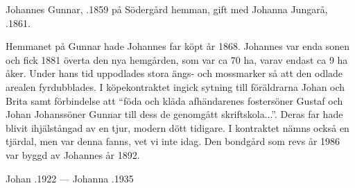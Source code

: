 Johannes Gunnar, .1859 på Södergård hemman, gift med Johanna Jungarå, .1861.
\begin{jhchildren}
  \item {}
  \item {}
  \item {}
  \item {}
  \item {}
  \item {}
  \item {}
  \item {}
  \item {}
  \item {}
  \item {}
  \item {}
\end{jhchildren}

Hemmanet på Gunnar hade Johannes far köpt år 1868. Johannes var enda sonen och fick 1881 överta den nya hemgården, som var ca 70 ha, varav endast ca 9 ha åker. Under hans tid uppodlades stora ängs- och mossmarker så att den odlade arealen fyrdubblades. I köpekontraktet ingick sytning till föräldrarna Johan och Brita samt förbindelse att ``föda och kläda afhändarenes fostersöner Gustaf och Johan Johanssöner Gunnar till dess de genomgått skriftskola...''. Deras far hade blivit ihjälstångad av en tjur, modern dött tidigare. I kontraktet nämns också en tjärdal, men var denna fanns, vet vi inte idag. Den bondgård som revs år 1986 var byggd av Johannes år 1892.

Johan .1922  ---  Johanna .1935



